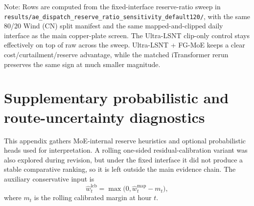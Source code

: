 \documentclass[review,1p,times]{elsarticle}
\newcommand{\aeTableNote}[1]{%
  \par\vspace{2pt}%
  \noindent\begin{minipage}{\linewidth}
    \raggedright\footnotesize
    Note: #1
  \end{minipage}%
  \par
}
\begin{document}
\begin{table}[t]
\centering
\caption{Reserve-ratio sensitivity under the fixed copper-plate interface on the 120-day Wind (CN) mapped screen. Negative deltas indicate lower burden than the matched raw stream.}
\label{tab:reserve_ratio_sensitivity}
\scriptsize
\setlength{\tabcolsep}{3.6pt}
\aeTableNote{Rows are computed from the fixed-interface reserve-ratio sweep in \texttt{results/ae\_dispatch\_reserve\_ratio\_sensitivity\_default120/}, with the same 80/20 Wind (CN) split manifest and the same mapped-and-clipped daily interface as the main copper-plate screen. The Ultra-LSNT clip-only control stays effectively on top of raw across the sweep. Ultra-LSNT + FG-MoE keeps a clear cost/curtailment/reserve advantage, while the matched iTransformer rerun preserves the same sign at much smaller magnitude.}
\end{table}

\section{Supplementary probabilistic and route-uncertainty diagnostics}\label{app:uq_reserve}
This appendix gathers MoE-internal reserve heuristics and optional probabilistic heads used for interpretation. A rolling one-sided residual-calibration variant was also explored during revision, but under the fixed interface it did not produce a stable comparative ranking, so it is left outside the main evidence chain. The auxiliary conservative input is
\begin{equation}
\hat{w}^{\mathrm{lcb}}_t=\max\!\big(0,\hat{w}^{\mathrm{map}}_t-m_t\big),
\end{equation}
where $m_t$ is the rolling calibrated margin at hour $t$.
\end{document}
